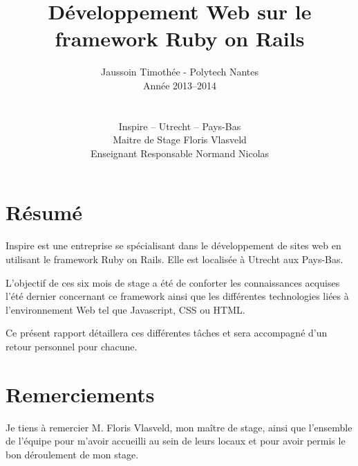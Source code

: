 \documentclass[12pt,a4paper]{book}
\author{Jaussoin Timothée - Polytech Nantes\\ Année 2013--2014 \\
\\ \\ Inspire -- Utrecht -- Pays-Bas\\  Maitre de Stage Floris Vlasveld\\ Enseignant Responsable Normand Nicolas}
\title{Développement Web sur le framework Ruby on Rails}
\begin{document}
\begin{titlepage}
	\maketitle
\end{titlepage}

\tableofcontents

\newpage
\clearpage
{}
    \section*{Résumé}
	

  Inspire est une entreprise se spécialisant dans le développement de sites web en utilisant le framework Ruby on Rails. Elle est localisée à Utrecht aux Pays-Bas.
  
  L'objectif de ces six mois de stage a été de conforter les connaissances acquises l'été dernier concernant ce framework ainsi que les différentes technologies liées à l'environnement Web tel que Javascript, CSS ou HTML.

    Ce présent rapport détaillera ces différentes tâches et sera accompagné d'un retour personnel pour chacune.  

\newpage
\clearpage
{}
\section*{Remerciements}

Je tiens à remercier M. Floris Vlasveld, mon maître de stage, ainsi que l'ensemble de l'équipe pour m'avoir accueilli au sein de leurs locaux et pour avoir permis le bon déroulement de mon stage.

\end{document}
